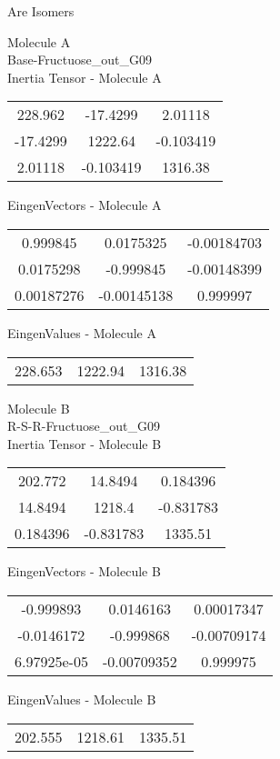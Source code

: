 \begin{center}
\vtab
\vtab
\textcolor{NavyBlue}{\Large Are Isomers}
\end{center}
\newpage
\begin{multicols}{2}
\begin{center}
Molecule A \\ 
Base-Fructuose\_out\_G09
\\
Inertia Tensor - Molecule A \\
\vtab
\begin{tabular}{|c c c|}
228.962	 & 	-17.4299	 & 	2.01118	 \\
-17.4299	 & 	1222.64	 & 	-0.103419	 \\
2.01118	 & 	-0.103419	 & 	1316.38
\end{tabular}

\vtab
 EingenVectors - Molecule A     \\
\vtab
\begin{tabular}{|c c c|}
0.999845	 & 	0.0175325	 & 	-0.00184703	 \\
0.0175298	 & 	-0.999845	 & 	-0.00148399	 \\
0.00187276	 & 	-0.00145138	 & 	0.999997
\end{tabular}

\vtab
 EingenValues - Molecule A     \\
\vtab
\begin{tabular}{|c c c|}
228.653	 & 	1222.94	 & 	1316.38
\end{tabular}
\columnbreak

Molecule B \\ 
R-S-R-Fructuose\_out\_G09
\\
Inertia Tensor - Molecule B \\
\vtab
\begin{tabular}{|c c c|}
202.772	 & 	14.8494	 & 	0.184396	 \\
14.8494	 & 	1218.4	 & 	-0.831783	 \\
0.184396	 & 	-0.831783	 & 	1335.51
\end{tabular}

\vtab
 EingenVectors - Molecule B     \\
\vtab
\begin{tabular}{|c c c|}
-0.999893	 & 	0.0146163	 & 	0.00017347	 \\
-0.0146172	 & 	-0.999868	 & 	-0.00709174	 \\
6.97925e-05	 & 	-0.00709352	 & 	0.999975
\end{tabular}

\vtab
 EingenValues - Molecule B     \\
\vtab
\begin{tabular}{|c c c|}
202.555	 & 	1218.61	 & 	1335.51
\end{tabular}

\end{center}
\end{multicols}
